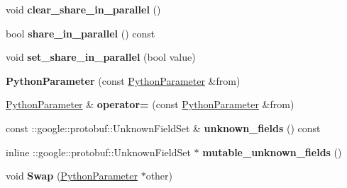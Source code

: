 \begin{DoxyCompactItemize}
\mbox{\label{classcaffe_1_1_python_parameter_abb688fbfb89bc477941955511fb94291}} 
void {\bfseries clear\+\_\+share\+\_\+in\+\_\+parallel} ()
\item 
\mbox{\label{classcaffe_1_1_python_parameter_a57002d9da09ff4ec462e23a7dba97690}} 
bool {\bfseries share\+\_\+in\+\_\+parallel} () const
\item 
\mbox{\label{classcaffe_1_1_python_parameter_aa0c292ff47f8766e14180e54495e5033}} 
void {\bfseries set\+\_\+share\+\_\+in\+\_\+parallel} (bool value)
\item 
\mbox{\label{classcaffe_1_1_python_parameter_acaba4307a226f540b29b56ba96352827}} 
{\bfseries Python\+Parameter} (const \mbox{\hyperlink{classcaffe_1_1_python_parameter}{Python\+Parameter}} \&from)
\item 
\mbox{\label{classcaffe_1_1_python_parameter_a7f1bb2458e725ab420754346d1864297}} 
\mbox{\hyperlink{classcaffe_1_1_python_parameter}{Python\+Parameter}} \& {\bfseries operator=} (const \mbox{\hyperlink{classcaffe_1_1_python_parameter}{Python\+Parameter}} \&from)
\item 
\mbox{\label{classcaffe_1_1_python_parameter_aae1915aef88f7c6ff8c0b8674869867e}} 
const \+::google\+::protobuf\+::\+Unknown\+Field\+Set \& {\bfseries unknown\+\_\+fields} () const
\item 
\mbox{\label{classcaffe_1_1_python_parameter_a1c6c59aded85088b1cafdb418c6add8b}} 
inline \+::google\+::protobuf\+::\+Unknown\+Field\+Set $\ast$ {\bfseries mutable\+\_\+unknown\+\_\+fields} ()
\item 
\mbox{\label{classcaffe_1_1_python_parameter_ad2fe3ef821200117e4211206ccb586b5}} 
void {\bfseries Swap} (\mbox{\hyperlink{classcaffe_1_1_python_parameter}{Python\+Parameter}} $\ast$other)
\item 
\mbox{\label{classcaffe_1_1_python_parameter_ab7b34e65b6c108ca50964fb36c4efe5f}} 

\end{DoxyCompactItemize}
